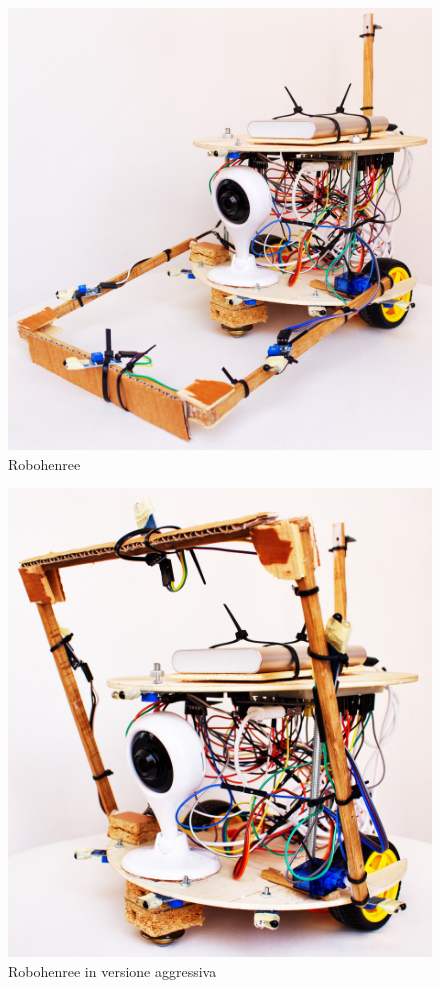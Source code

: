 \documentclass[a4paper,12pt,italian]{article}
\begin{document}
\begin{figure}[H]
\begin{center}
\includegraphics[scale=0.07]{robohenree_1}
\caption{Robohenree}
\label{Fig: robohenree}
\end{center}
\end{figure}

\begin{figure}[H]
\begin{center}
\includegraphics[scale=0.07]{robohenree_2}
\caption{Robohenree in versione aggressiva}
\label{Fig: robohenree}
\end{center}
\end{figure}
\end{document}
